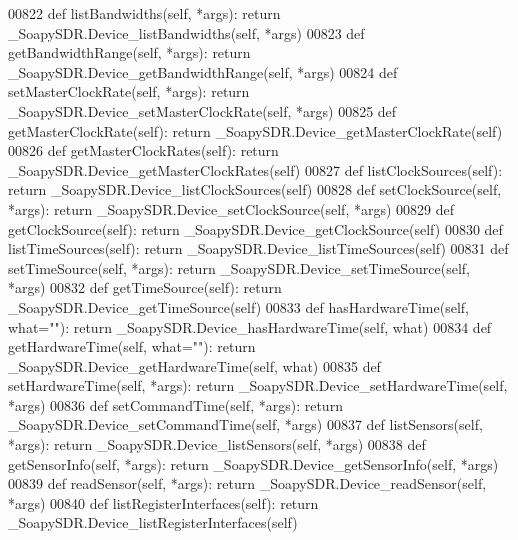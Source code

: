 \begin{DoxyCode}
{{{{{00822     \textcolor{keyword}{def }listBandwidths(self, *args): \textcolor{keywordflow}{return} \_SoapySDR.Device\_listBandwidths(self, *args)
00823     \textcolor{keyword}{def }getBandwidthRange(self, *args): \textcolor{keywordflow}{return} \_SoapySDR.Device\_getBandwidthRange(self, *args)
00824     \textcolor{keyword}{def }setMasterClockRate(self, *args): \textcolor{keywordflow}{return} \_SoapySDR.Device\_setMasterClockRate(self, *args)
00825     \textcolor{keyword}{def }getMasterClockRate(self): \textcolor{keywordflow}{return} \_SoapySDR.Device\_getMasterClockRate(self)
00826     \textcolor{keyword}{def }getMasterClockRates(self): \textcolor{keywordflow}{return} \_SoapySDR.Device\_getMasterClockRates(self)
00827     \textcolor{keyword}{def }listClockSources(self): \textcolor{keywordflow}{return} \_SoapySDR.Device\_listClockSources(self)
00828     \textcolor{keyword}{def }setClockSource(self, *args): \textcolor{keywordflow}{return} \_SoapySDR.Device\_setClockSource(self, *args)
00829     \textcolor{keyword}{def }getClockSource(self): \textcolor{keywordflow}{return} \_SoapySDR.Device\_getClockSource(self)
00830     \textcolor{keyword}{def }listTimeSources(self): \textcolor{keywordflow}{return} \_SoapySDR.Device\_listTimeSources(self)
00831     \textcolor{keyword}{def }setTimeSource(self, *args): \textcolor{keywordflow}{return} \_SoapySDR.Device\_setTimeSource(self, *args)
00832     \textcolor{keyword}{def }getTimeSource(self): \textcolor{keywordflow}{return} \_SoapySDR.Device\_getTimeSource(self)
00833     \textcolor{keyword}{def }hasHardwareTime(self, what=""): \textcolor{keywordflow}{return} \_SoapySDR.Device\_hasHardwareTime(self, what)
00834     \textcolor{keyword}{def }getHardwareTime(self, what=""): \textcolor{keywordflow}{return} \_SoapySDR.Device\_getHardwareTime(self, what)
00835     \textcolor{keyword}{def }setHardwareTime(self, *args): \textcolor{keywordflow}{return} \_SoapySDR.Device\_setHardwareTime(self, *args)
00836     \textcolor{keyword}{def }setCommandTime(self, *args): \textcolor{keywordflow}{return} \_SoapySDR.Device\_setCommandTime(self, *args)
00837     \textcolor{keyword}{def }listSensors(self, *args): \textcolor{keywordflow}{return} \_SoapySDR.Device\_listSensors(self, *args)
00838     \textcolor{keyword}{def }getSensorInfo(self, *args): \textcolor{keywordflow}{return} \_SoapySDR.Device\_getSensorInfo(self, *args)
00839     \textcolor{keyword}{def }readSensor(self, *args): \textcolor{keywordflow}{return} \_SoapySDR.Device\_readSensor(self, *args)
00840     \textcolor{keyword}{def }listRegisterInterfaces(self): \textcolor{keywordflow}{return} \_SoapySDR.Device\_listRegisterInterfaces(self)
}}}}}
\end{DoxyCode}
